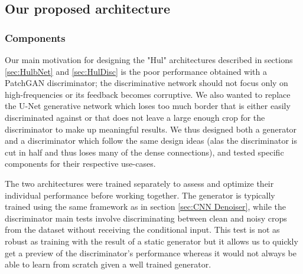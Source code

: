 \subsection{Our proposed architecture}
\subsubsection{Components}\label{sec:Components}
Our main motivation for designing the "Hul" architectures described in sections \ref{sec:HulbNet} and \ref{sec:HulDisc} is the poor performance obtained with a PatchGAN discriminator; the discriminative network should not focus only on high-frequencies or its feedback becomes corruptive. We also wanted to replace the U-Net generative network which loses too much border that is either easily discriminated against or that does not leave a large enough crop for the discriminator to make up meaningful results. We thus designed both a generator and a discriminator which follow the same design ideas (alas the discriminator is cut in half and thus loses many of the dense connections), and tested specific components for their respective use-cases.


The two architectures were trained separately to assess and optimize their individual performance before working together. The generator is typically trained using the same framework as in section \ref{sec:CNN Denoiser}, while the discriminator main tests involve discriminating between clean and noisy crops from the dataset without receiving the conditional input. This test is not as robust as training with the result of a static generator but it allows us to quickly get a preview of the discriminator's performance whereas it would not always be able to learn from scratch given a well trained generator.

